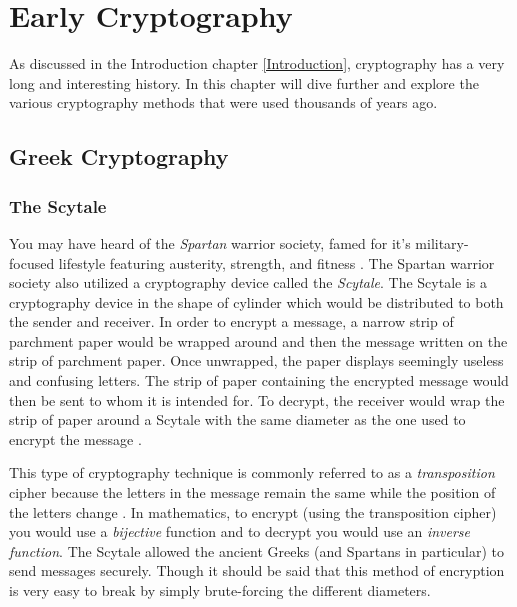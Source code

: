 \chapter{Early Cryptography} %
\label{Early Cryptography} %


As discussed in the Introduction chapter \ref{Introduction}, cryptography has a very long and interesting history. 
In this chapter will dive further and explore the various cryptography methods that were used thousands of years ago.

\section{Greek Cryptography}

\subsection{The Scytale}

You may have heard of the \textit{Spartan} warrior society, famed for it's military-focused lifestyle featuring austerity,
strength, and fitness \cite{wiki:spartan_army}. The Spartan warrior society also utilized a cryptography device called the
\textit{Scytale}. The Scytale is a cryptography device in the shape of cylinder which would be distributed to both the sender
and receiver. In order to encrypt a message, a narrow strip of parchment paper would be wrapped around and then the message
written on the strip of parchment paper. Once unwrapped, the paper displays seemingly useless and confusing letters. The 
strip of paper containing the encrypted message would then be sent to whom it is intended for. To decrypt, the receiver would
wrap the strip of paper around a Scytale with the same diameter as the one used to encrypt the message 
\cite{history_of_cryptography}.

This type of cryptography technique is commonly referred to as a \textit{transposition} cipher because the letters
in the message remain the same while the position of the letters change \cite{wiki:scytale}. In mathematics, to encrypt
(using the transposition cipher) you would use a \textit{bijective} function and to decrypt you would use an 
\textit{inverse function}. The Scytale allowed the ancient Greeks (and Spartans in particular) to send messages 
securely. Though it should be said that this method of encryption is very easy to break by simply brute-forcing the different 
diameters.

